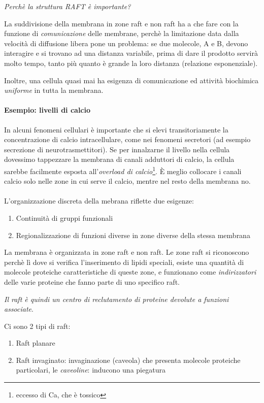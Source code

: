 \documentclass[a4paper,12pt]{article}
\begin{document}
\emph{Perchè la struttura RAFT è importante?}

La suddivisione della membrana in zone raft e non raft ha a che fare con la funzione di \emph{comunicazione} delle membrane, perchè la limitazione data dalla velocità di diffusione libera pone un problema: se due molecole, A e B, devono interagire e si trovano ad una distanza variabile, prima di dare il prodotto servirà molto tempo, tanto più quanto è grande la loro distanza (relazione esponenziale).

Inoltre, una cellula quasi mai ha esigenza di comunicazione ed attività biochimica \emph{uniforme} in tutta la membrana.
\paragraph{Esempio: livelli di calcio}
In alcuni fenomeni cellulari è importante che si elevi transitoriamente la concentrazione di calcio intracellulare, come nei fenomeni secretori (ad esempio secrezione di neurotrasmettitori).
Se per innalzarne il livello nella cellula dovessimo tappezzare la membrana di canali adduttori di calcio, la cellula sarebbe facilmente esposta all'\emph{overload di calcio}\footnote{eccesso di Ca, che è tossico}.
È meglio collocare i canali calcio solo nelle zone in cui serve il calcio, mentre nel resto della membrana no.

\paragraph{}
L'organizzazione discreta della mebrana riflette due esigenze:
\begin{enumerate}
\item{Continuità di gruppi funzionali}
\item{Regionalizzazione di funzioni diverse in zone diverse della stessa membrana}
\end{enumerate}

La membrana è organizzata in zone raft e non raft. Le zone raft si riconoscono perchè lì dove si verifica l'inserimento di lipidi speciali, esiste una quantità di molecole proteiche caratteristiche di queste zone, e funzionano come \emph{indirizzatori} delle varie proteine che fanno parte di uno specifico raft.

\emph{Il raft è quindi un centro di reclutamento di proteine devolute a funzioni associate}.

Ci sono 2 tipi di raft:
\begin{enumerate}
\item{Raft planare}
\item{Raft invaginato: invaginazione (caveola) che presenta molecole proteiche particolari, le \emph{caveoline}: inducono una piegatura}
\end{enumerate}
\end{document}
